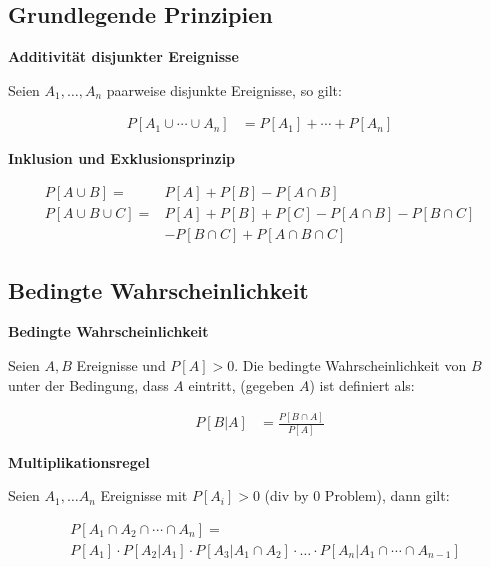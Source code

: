 \documentclass[25pt]{sciposter}
\newenvironment{method}[1]{\begin{mdframed}[backgroundcolor=blue!10,innertopmargin=15pt, innerbottommargin=15pt]
		\textbf{#1 }
	}
	{ 
	\end{mdframed}
}
\newenvironment{thm}[1]{\begin{mdframed}[backgroundcolor=pink!50,innertopmargin=15pt, innerbottommargin=15pt, nobreak=false]
		\textbf{#1 }
	}
	{ 
	\end{mdframed}
}
\begin{document}
\begin{multicols}{3}
\subsection*{Grundlegende Prinzipien}



\begin{thm}{Additivität disjunkter Ereignisse}
	Seien $A_1, \ldots, A_n$ paarweise disjunkte Ereignisse, so gilt:
	
	\begin{align*}
	P[A_1\cup \cdots \cup A_n] &= P[A_1] + \cdots + P[A_n]
	\end{align*}
	
\end{thm}

\begin{thm}{Inklusion und Exklusionsprinzip}
	\begin{align*}
		P[A\cup B] =& P[A] + P[B] - P[A\cap B]\\
		P[A\cup B\cup C] =& P[A] + P[B] + P[C] - P[A\cap B] - P[B\cap C] \\
		&- P[B\cap C] + P[A\cap B \cap C]
	\end{align*}
\end{thm}



\subsection*{Bedingte Wahrscheinlichkeit}

\begin{method}{Bedingte Wahrscheinlichkeit}
Seien $A, B$ Ereignisse und $P[A] > 0$. Die bedingte Wahrscheinlichkeit von $B$ unter der Bedingung, dass $A$ eintritt, (gegeben $A$) ist definiert als:

\begin{align*}
	P[B|A] &= \frac{P[B \cap A]}{P[A]}
\end{align*}

\end{method}

\begin{thm}{Multiplikationsregel}
	Seien $A_1,\ldots A_n$ Ereignisse mit $P[A_i]>0$ (div by $0$ Problem), dann gilt:
	
	\begin{align*}
		&P[A_1 \cap A_2 \cap \cdots \cap A_n] = \\
		&P[A_1] \cdot P[A_2 | A_1] \cdot P[A_3|A_1 \cap A_2] \cdot \ldots \cdot P[A_n | A_1 \cap \cdots \cap A_{n-1}]
	\end{align*}
\end{thm}


\end{multicols}
\end{document}
